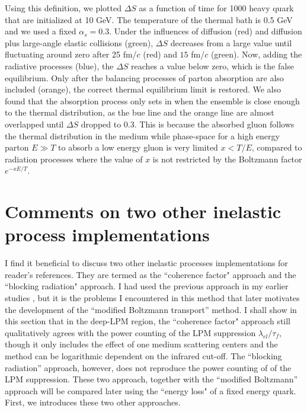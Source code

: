 Using this definition, we plotted $\Delta S$ as a function of time for 1000 heavy quark that are initialized at 10 GeV.
The temperature of the thermal bath is 0.5 GeV and we used a fixed $\alpha_s = 0.3$.
Under the influences of diffusion (red) and diffusion plus large-angle elastic collisions (green), $\Delta S$ decreases from a large value until fluctuating around zero after 25 fm/$c$ (red) and $15$ fm/$c$ (green).
Now, adding the radiative processes (blue), the $\Delta S$ reaches a value below zero, which is the false equilibrium.
Only after the balancing processes of parton absorption are also included (orange), the correct thermal equilibrium limit is restored. 
We also found that the absorption process only sets in when the ensemble is close enough to the thermal distribution, as the bue line and the orange line are almost overlapped until $\Delta S$ dropped to 0.3.
This is because the absorbed gluon follows the thermal distribution in the medium while phase-space for a high energy parton $E\gg T$ to absorb a low energy gluon is very limited $x<T/E$, compared to radiation processes where the value of $x$ is not restricted by the Boltzmann factor $e^{-xE/T}$.

\section{Comments on two other inelastic process implementations}
I find it beneficial to discuss two other inelastic processes implementations for reader's references. 
They are termed as the ``coherence factor" approach and the ``blocking radiation" approach.
I had used the previous approach in my earlier studies \cite{Ke:2018tsh}, but it is the problems I encountered in this method that later motivates the development of the ``modified Boltzmann transport'' method. 
I shall show in this section that in the deep-LPM region, the ``coherence factor" approach still qualitatively agrees with the power counting of the LPM suppression $\lambda_{el}/\tau_f$, though it only includes the effect of one medium scattering centers and the method can be logarithmic dependent on the infrared cut-off.
The ``blocking radiation'' approach, however,  does not reproduce the power counting of of the LPM suppression.
These two approach, together with the ``modified Boltzmann'' approach will be compared later using the ``energy loss" of a fixed energy quark.
First, we introduces these two other approaches.

